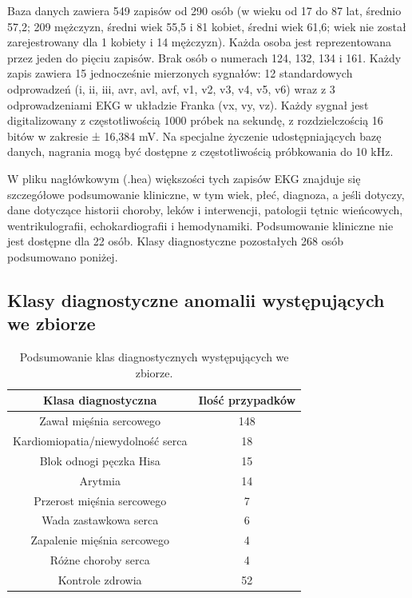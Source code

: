 \documentclass[12pt,a4paper]{article}
\begin{document}
Baza danych zawiera 549 zapisów od 290 osób (w wieku od 17 do 87 lat, średnio 57,2; 209 mężczyzn, średni wiek 55,5 i 81 kobiet, średni wiek 61,6; wiek nie został zarejestrowany dla 1 kobiety i 14 mężczyzn). Każda osoba jest reprezentowana przez jeden do pięciu zapisów. Brak osób o numerach 124, 132, 134 i 161. Każdy zapis zawiera 15 jednocześnie mierzonych sygnałów: 12 standardowych odprowadzeń (i, ii, iii, avr, avl, avf, v1, v2, v3, v4, v5, v6) wraz z 3 odprowadzeniami EKG w układzie Franka (vx, vy, vz). Każdy sygnał jest digitalizowany z częstotliwością 1000 próbek na sekundę, z rozdzielczością 16 bitów w zakresie ± 16,384 mV. Na specjalne życzenie udostępniających bazę danych, nagrania mogą być dostępne z częstotliwością próbkowania do 10 kHz.

W pliku nagłówkowym (.hea) większości tych zapisów EKG znajduje się szczegółowe podsumowanie kliniczne, w tym wiek, płeć, diagnoza, a jeśli dotyczy, dane dotyczące historii choroby, leków i interwencji, patologii tętnic wieńcowych, wentrikulografii, echokardiografii i hemodynamiki. Podsumowanie kliniczne nie jest dostępne dla 22 osób. Klasy diagnostyczne pozostałych 268 osób podsumowano poniżej.

\subsection{Klasy diagnostyczne anomalii występujących we zbiorze}

\begin{table}[H]
    \centering
    \begin{tabular}{|c|c|}
         \hline
         \textbf{Klasa diagnostyczna} & \textbf{Ilość przypadków} \\
         \hline
         Zawał mięśnia sercowego & 148 \\ 
         \hline
         Kardiomiopatia/niewydolność serca & 18 \\
         \hline
         Blok odnogi pęczka Hisa & 15 \\
         \hline
         Arytmia & 14 \\
         \hline
         Przerost mięśnia sercowego & 7 \\
         \hline
         Wada zastawkowa serca & 6 \\
         \hline
         Zapalenie mięśnia sercowego & 4 \\
         \hline
         Różne choroby serca & 4 \\
         \hline
         Kontrole zdrowia & 52 \\
         \hline
    \end{tabular}
    \caption{Podsumowanie klas diagnostycznych występujących we zbiorze.}
    \label{tab:anomalies_in_dataset}
\end{table}
\end{document}
